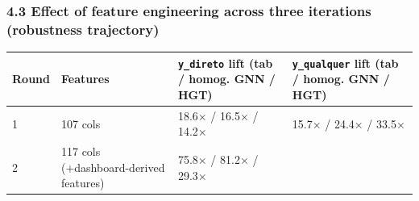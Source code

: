 \documentclass[11pt,]{article}
\begin{document}
\hypertarget{effect-of-feature-engineering-across-three-iterations-robustness-trajectory}{%
\subsubsection{4.3 Effect of feature engineering across three iterations
(robustness
trajectory)}\label{effect-of-feature-engineering-across-three-iterations-robustness-trajectory}}

\begin{longtable}[]{@{}llll@{}}
\toprule
\begin{minipage}[b]{0.22\columnwidth}\raggedright
Round\strut
\end{minipage} & \begin{minipage}[b]{0.22\columnwidth}\raggedright
Features\strut
\end{minipage} & \begin{minipage}[b]{0.22\columnwidth}\raggedright
\texttt{y\_direto} lift (tab / homog. GNN / HGT)\strut
\end{minipage} & \begin{minipage}[b]{0.22\columnwidth}\raggedright
\texttt{y\_qualquer} lift (tab / homog. GNN / HGT)\strut
\end{minipage}\tabularnewline
\midrule
\endhead
\begin{minipage}[t]{0.22\columnwidth}\raggedright
1\strut
\end{minipage} & \begin{minipage}[t]{0.22\columnwidth}\raggedright
107 cols\strut
\end{minipage} & \begin{minipage}[t]{0.22\columnwidth}\raggedright
18.6× / 16.5× / 14.2×\strut
\end{minipage} & \begin{minipage}[t]{0.22\columnwidth}\raggedright
15.7× / 24.4× / 33.5×\strut
\end{minipage}\tabularnewline
\begin{minipage}[t]{0.22\columnwidth}\raggedright
2\strut
\end{minipage} & \begin{minipage}[t]{0.22\columnwidth}\raggedright
117 cols (+dashboard-derived features)\strut
\end{minipage} & \begin{minipage}[t]{0.22\columnwidth}\raggedright
75.8× / 81.2× / 29.3×\strut
\end{minipage} & \begin{minipage}[t]{0.22\columnwidth}\raggedright

\end{minipage}
\end{longtable}
\end{document}
